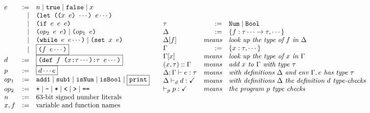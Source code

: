 \documentclass[10pt, oneside]{article}
\begin{document}
\[
\begin{array}{ll}
\begin{array}{lrl}
e & := & n \mid \texttt{true} \mid \texttt{false} \mid x \\
  & \mid  & \texttt{(let (($x\ e$) $\cdots$) $e \cdots$)} \\
  & \mid  & \texttt{(if $e\ e \ e$)} \\
  & \mid  & \texttt{($op_2$ $e\ e$)} \mid \texttt{($op_1$ $e$)} \\
  & \mid  & \texttt{(while $e\ e \cdots$)} \mid \texttt{(set $x\ e$)} \\
  & \mid  & \fbox{\texttt{($f\ e\cdots$)}} \\
d & := & \fbox{\texttt{(def $f$ ($x$:$\tau \cdots$):$\tau$ $e \cdots$)}} \\
p & := & \fbox{$d \cdots e$} \\
op_1 & := & \texttt{add1} \mid \texttt{sub1} \mid \texttt{isNum} \mid \texttt{isBool} \mid \fbox{\texttt{print}} \\
op_2 & := & \texttt{+} \mid \texttt{-} \mid \texttt{*} \mid \texttt{<} \mid \texttt{>} \mid \texttt{==} \\
n & := & \textrm{63-bit signed number literals} \\
x,f & := & \textrm{variable and function names} \\
\end{array}
&
\begin{array}{lrl}
\tau & := & \texttt{Num} \mid \texttt{Bool} \\
\Delta & := & \{f: \tau \cdots \rightarrow \tau, \cdots\} \\
\Delta[f] & \textit{means} & \textit{look up the type of } f \textit{ in } \Delta \\
\Gamma & := & \{x:\tau,\cdots\} \\
\Gamma[x] & \textit{means} & \textit{look up the type of } x \textit{ in } \Gamma \\
(x,\tau)::\Gamma & \textit{means} & \textit{add } x \textit{ to } \Gamma \textit{ with type } \tau \\
\Delta;\Gamma \vdash e : \tau & \textit{means} & \textit{with definitions } \Delta \textit{ and env } \Gamma, e \textit{ has type } \tau \\
\Delta \vdash_d d : \checkmark & \textit{means} & \textit{with definitions } \Delta \textit{ the definition } d \textit{ type-checks} \\
\vdash_p p : \checkmark & \textit{means} & \textit{the program } p \textit{ type checks } \\
\end{array}
\end{array}
\]
\end{document}
